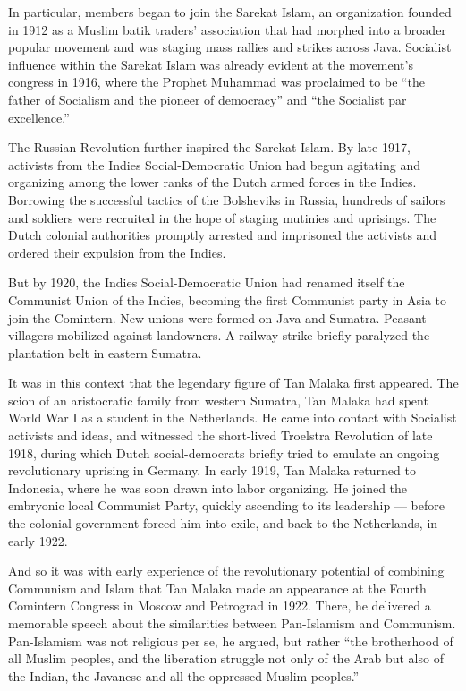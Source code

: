 In particular, members began to join the Sarekat Islam, an organization
founded in 1912 as a Muslim batik traders' association that had morphed
into a broader popular movement and was staging mass rallies and strikes
across Java. Socialist influence within the Sarekat Islam was already
evident at the movement's congress in 1916, where the Prophet Muhammad
was proclaimed to be ``the father of Socialism and the pioneer of
democracy'' and ``the Socialist par excellence.''

The Russian Revolution further inspired the Sarekat Islam. By late 1917,
activists from the Indies Social-Democratic Union had begun agitating
and organizing among the lower ranks of the Dutch armed forces in the
Indies. Borrowing the successful tactics of the Bolsheviks in Russia,
hundreds of sailors and soldiers were recruited in the hope of staging
mutinies and uprisings. The Dutch colonial authorities promptly arrested
and imprisoned the activists and ordered their expulsion from the
Indies.

But by 1920, the Indies Social-Democratic Union had renamed itself the
Communist Union of the Indies, becoming the first Communist party in
Asia to join the Comintern. New unions were formed on Java and Sumatra.
Peasant villagers mobilized against landowners. A railway strike briefly
paralyzed the plantation belt in eastern Sumatra.

It was in this context that the legendary figure of Tan Malaka first
appeared. The scion of an aristocratic family from western Sumatra, Tan
Malaka had spent World War I as a student in the Netherlands. He came
into contact with Socialist activists and ideas, and witnessed the
short-lived Troelstra Revolution of late 1918, during which Dutch
social-democrats briefly tried to emulate an ongoing revolutionary
uprising in Germany. In early 1919, Tan Malaka returned to Indonesia,
where he was soon drawn into labor organizing. He joined the embryonic
local Communist Party, quickly ascending to its leadership --- before
the colonial government forced him into exile, and back to the
Netherlands, in early 1922.

And so it was with early experience of the revolutionary potential of
combining Communism and Islam that Tan Malaka made an appearance at the
Fourth Comintern Congress in Moscow and Petrograd in 1922. There, he
delivered a memorable speech about the similarities between Pan-Islamism
and Communism. Pan-Islamism was not religious per se, he argued, but
rather ``the brotherhood of all Muslim peoples, and the liberation
struggle not only of the Arab but also of the Indian, the Javanese and
all the oppressed Muslim peoples.''


